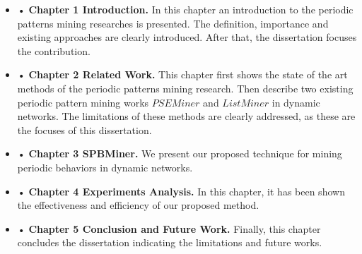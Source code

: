 \begin{itemize}

\item {•} \textbf{Chapter 1 Introduction.} In this chapter an introduction to the periodic patterns mining researches is presented. The definition, importance and existing approaches are clearly introduced. After that, the dissertation focuses the contribution. 

\item {•} \textbf{Chapter 2 Related Work.} This chapter first shows the state of the art methods of the periodic patterns mining research. Then describe two existing periodic pattern mining works $PSEMiner$ and $ListMiner$ in dynamic networks. The limitations of these methods are clearly addressed, as these are the focuses of this dissertation. 

\item {•} \textbf{Chapter 3 SPBMiner.} We present our proposed technique for mining periodic behaviors in dynamic networks.  

\item {•} \textbf{Chapter 4 Experiments Analysis.} In this chapter, it has been shown the effectiveness and efficiency of our proposed method.

\item {•} \textbf{Chapter 5 Conclusion and Future Work.} Finally, this chapter concludes the dissertation indicating the limitations and future works.
\end{itemize} 
%
